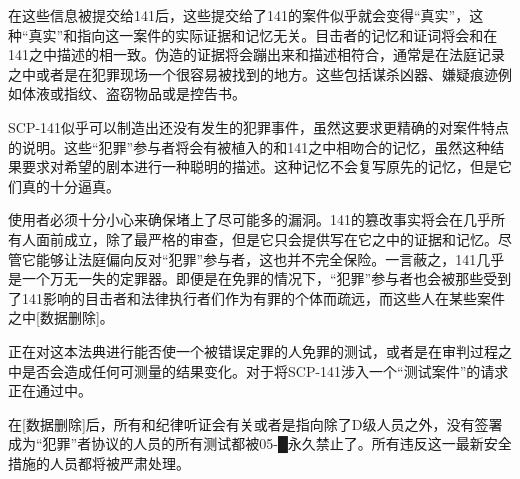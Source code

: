 在这些信息被提交给141后，这些提交给了141的案件似乎就会变得“真实”，这种“真实”和指向这一案件的实际证据和记忆无关。目击者的记忆和证词将会和在141之中描述的相一致。伪造的证据将会蹦出来和描述相符合，通常是在法庭记录之中或者是在犯罪现场一个很容易被找到的地方。这些包括谋杀凶器、嫌疑痕迹例如体液或指纹、盗窃物品或是控告书。

SCP-141似乎可以制造出还没有发生的犯罪事件，虽然这要求更精确的对案件特点的说明。这些“犯罪”参与者将会有被植入的和141之中相吻合的记忆，虽然这种结果要求对希望的剧本进行一种聪明的描述。这种记忆不会复写原先的记忆，但是它们真的十分逼真。

使用者必须十分小心来确保堵上了尽可能多的漏洞。141的篡改事实将会在几乎所有人面前成立，除了最严格的审查，但是它只会提供写在它之中的证据和记忆。尽管它能够让法庭偏向反对“犯罪”参与者，这也并不完全保险。一言蔽之，141几乎是一个万无一失的定罪器。即便是在免罪的情况下，“犯罪”参与者也会被那些受到了141影响的目击者和法律执行者们作为有罪的个体而疏远，而这些人在某些案件之中{[}数据删除]。

正在对这本法典进行能否使一个被错误定罪的人免罪的测试，或者是在审判过程之中是否会造成任何可测量的结果变化。对于将SCP-141涉入一个“测试案件”的请求正在通过中。

在{[}数据删除]后，所有和纪律听证会有关或者是指向除了D级人员之外，没有签署成为“犯罪”者协议的人员的所有测试都被05-█永久禁止了。所有违反这一最新安全措施的人员都将被严肃处理。
